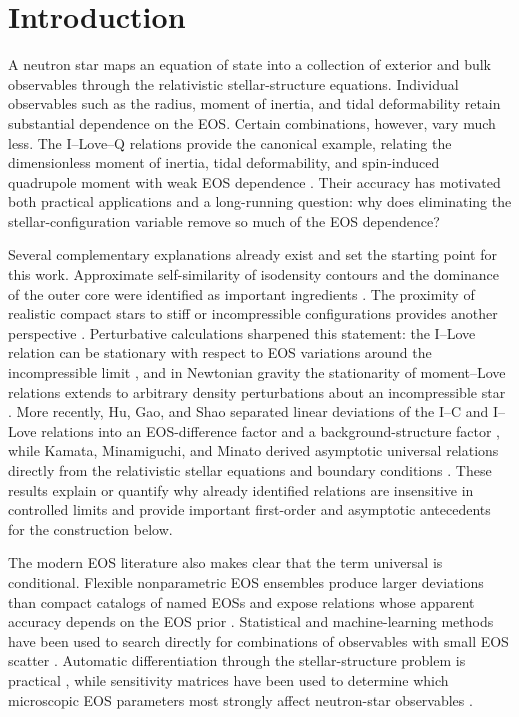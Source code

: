 \section{Introduction}
\label{sec:intro}

A neutron star maps an equation of state into a collection of exterior and bulk observables through the relativistic stellar-structure equations. Individual observables such as the radius, moment of inertia, and tidal deformability retain substantial dependence on the EOS. Certain combinations, however, vary much less. The I--Love--Q relations provide the canonical example, relating the dimensionless moment of inertia, tidal deformability, and spin-induced quadrupole moment with weak EOS dependence \cite{yagi2013iloveq}. Their accuracy has motivated both practical applications and a long-running question: why does eliminating the stellar-configuration variable remove so much of the EOS dependence?

Several complementary explanations already exist and set the starting point for this work. Approximate self-similarity of isodensity contours and the dominance of the outer core were identified as important ingredients \cite{yagi2014why}. The proximity of realistic compact stars to stiff or incompressible configurations provides another perspective \cite{sham2015unveiling}. Perturbative calculations sharpened this statement: the I--Love relation can be stationary with respect to EOS variations around the incompressible limit \cite{chan2016stationarity}, and in Newtonian gravity the stationarity of moment--Love relations extends to arbitrary density perturbations about an incompressible star \cite{yip2017tidal}. More recently, Hu, Gao, and Shao separated linear deviations of the I--C and I--Love relations into an EOS-difference factor and a background-structure factor \cite{hu2026linear}, while Kamata, Minamiguchi, and Minato derived asymptotic universal relations directly from the relativistic stellar equations and boundary conditions \cite{kamata2026asymptotic}. These results explain or quantify why already identified relations are insensitive in controlled limits and provide important first-order and asymptotic antecedents for the construction below.

The modern EOS literature also makes clear that the term universal is conditional. Flexible nonparametric EOS ensembles produce larger deviations than compact catalogs of named EOSs and expose relations whose apparent accuracy depends on the EOS prior \cite{legred2024assessing}. Statistical and machine-learning methods have been used to search directly for combinations of observables with small EOS scatter \cite{manoharan2024finding,kruger2026sbi}. Automatic differentiation through the stellar-structure problem is practical \cite{soma2023ad}, while sensitivity matrices have been used to determine which microscopic EOS parameters most strongly affect neutron-star observables \cite{cruzcamacho2026sensitivity}.


